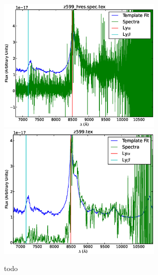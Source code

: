 \documentclass[11pt]{article}
\begin{document}
\begin{figure}[h]
  \includegraphics[width=8cm]{z599_hres.spec.eps}
  \includegraphics[width=8cm]{z599.eps}
  \caption{todo}
  \label{fig:todo}
\end{figure}
\end{document}
